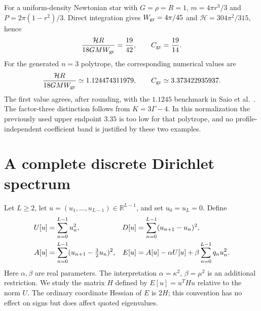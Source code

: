 \documentclass[11pt,letterpaper]{article}
\newcommand{\R}{\mathbb R}
\theoremstyle{definition}
\numberwithin{equation}{section}
\begin{document}
For a uniform-density Newtonian star with $G=\rho=R=1$,
$m=4\pi r^3/3$ and $P=2\pi(1-r^2)/3$. Direct integration gives
$W_{\rm gr}=4\pi/45$ and $\mathcal H=304\pi^2/315$, hence
\begin{equation}
 \frac{\mathcal H R}{18GM W_{\rm gr}}=\frac{19}{42},
 \qquad C_{\rm gr}=\frac{19}{14}.
 \label{eq:uniform-cgr}
\end{equation}
For the generated $n=3$ polytrope, the corresponding numerical values are
\begin{equation}
 \frac{\mathcal H R}{18GM W_{\rm gr}}\simeq1.124474311979,
 \qquad C_{\rm gr}\simeq3.373422935937.
 \label{eq:n3-cgr}
\end{equation}
The first value agrees, after rounding, with the $1.1245$ benchmark in
Saio et al.~\cite{saio}. The factor-three distinction follows from
$K=3\Gamma-4$. In this normalization the previously used upper endpoint
$3.35$ is too low for that polytrope, and no profile-independent coefficient
band is justified by these two examples.

\section{A complete discrete Dirichlet spectrum}
\label{sec:discrete}

Let $L\ge2$, let $u=(u_1,\ldots,u_{L-1})\in\R^{L-1}$, and set
$u_0=u_L=0$. Define
\begin{align}
 U[u]&=\sum_{n=0}^{L-1}u_n^2,&
 D[u]&=\sum_{n=0}^{L-1}(u_{n+1}-u_n)^2,\notag\\
 A[u]&=\sum_{n=0}^{L-1}(u_{n+1}-\tfrac32u_n)^2,&
 E[u]&=A[u]-\alpha U[u]+\beta\sum_{n=0}^{L-1}q_nu_n^2.
 \label{eq:discrete-form}
\end{align}
Here $\alpha,\beta$ are real parameters. The interpretation
$\alpha=\kappa^2$, $\beta=\mu^2$ is an additional restriction. We study
the matrix $H$ defined by $E[u]=u^THu$ relative to the norm $U$.
The ordinary coordinate Hessian of $E$ is $2H$; this convention has no
effect on signs but does affect quoted eigenvalues.
\end{document}
